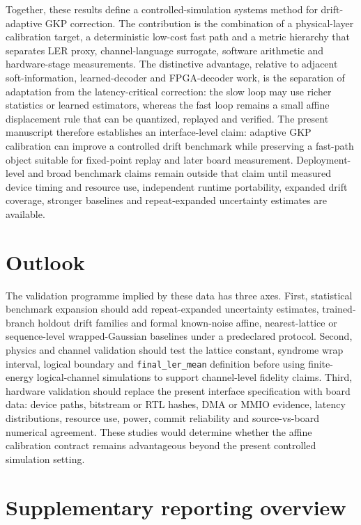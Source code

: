 \documentclass[11pt]{article}
\newcommand{\softwarehil}{controlled simulation}
\newcommand{\finalLER}{\texttt{final\_ler\_mean}}
\begin{document}
Together, these results define a controlled-simulation systems method for
drift-adaptive GKP correction.  The contribution is the combination of a
physical-layer calibration target, a deterministic low-cost fast path and a
metric hierarchy that separates LER proxy, channel-language surrogate, software
arithmetic and hardware-stage measurements.  The distinctive advantage,
relative to adjacent soft-information, learned-decoder and FPGA-decoder work,
is the separation of adaptation from the latency-critical correction: the slow
loop may use richer statistics or learned estimators, whereas the fast loop
remains a small affine displacement rule that can be quantized, replayed and
verified.  The present manuscript therefore establishes an interface-level
claim: adaptive GKP calibration can improve a controlled drift benchmark while
preserving a fast-path object suitable for fixed-point replay and later board
measurement.  Deployment-level and broad benchmark claims remain outside that
claim until measured device timing and resource use, independent runtime
portability, expanded drift coverage, stronger baselines and repeat-expanded
uncertainty estimates are available.

\section{Outlook}

The validation programme implied by these data has three axes.  First,
statistical benchmark expansion should add repeat-expanded uncertainty
estimates, trained-branch holdout drift families and formal known-noise affine,
nearest-lattice or sequence-level wrapped-Gaussian baselines under a
predeclared protocol.  Second, physics and channel validation should test the
lattice constant, syndrome wrap interval, logical boundary and \finalLER{}
definition before using finite-energy logical-channel simulations to support
channel-level fidelity claims.  Third, hardware validation should replace the
present interface specification with board data: device paths, bitstream or RTL
hashes, DMA or MMIO evidence, latency distributions, resource use, power,
commit reliability and source-vs-board numerical agreement.  These studies
would determine whether the affine calibration contract remains advantageous
beyond the present \softwarehil{} setting.

\appendix

\section*{Supplementary reporting overview}
\end{document}
